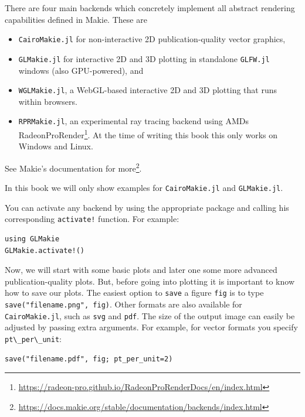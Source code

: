 \documentclass[
  notoc %
]{tufte-book}
\DeclareRobustCommand{\href}[2]{#2\footnote{\url{#1}}}
\providecommand{\tightlist}{%
  \setlength{\itemsep}{0pt}\setlength{\parskip}{0pt}
}
\newcommand{\passthrough}[1]{#1}
\begin{document}
There are four main backends which concretely implement all abstract
rendering capabilities defined in Makie. These are

\begin{itemize}
\tightlist
\item
  \passthrough{\lstinline!CairoMakie.jl!} for non-interactive 2D
  publication-quality vector graphics,
\item
  \passthrough{\lstinline!GLMakie.jl!} for interactive 2D and 3D
  plotting in standalone \passthrough{\lstinline!GLFW.jl!} windows (also
  GPU-powered), and
\item
  \passthrough{\lstinline!WGLMakie.jl!}, a WebGL-based interactive 2D
  and 3D plotting that runs within browsers.
\item
  \passthrough{\lstinline!RPRMakie.jl!}, an experimental ray tracing
  backend using AMDs
  \href{https://radeon-pro.github.io/RadeonProRenderDocs/en/index.html}{RadeonProRender}.
  At the time of writing this book this only works on Windows and Linux.
\end{itemize}

\href{https://docs.makie.org/stable/documentation/backends/index.html}{See
Makie's documentation for more}.

In this book we will only show examples for
\passthrough{\lstinline!CairoMakie.jl!} and
\passthrough{\lstinline!GLMakie.jl!}.

You can activate any backend by using the appropriate package and
calling his corresponding \passthrough{\lstinline"activate!"} function.
For example:

\begin{lstlisting}
using GLMakie
GLMakie.activate!()
\end{lstlisting}

Now, we will start with some basic plots and later one some more
advanced publication-quality plots. But, before going into plotting it
is important to know how to save our plots. The easiest option to
\passthrough{\lstinline!save!} a figure \passthrough{\lstinline!fig!} is
to type \passthrough{\lstinline!save("filename.png", fig)!}. Other
formats are also available for \passthrough{\lstinline!CairoMakie.jl!},
such as \passthrough{\lstinline!svg!} and \passthrough{\lstinline!pdf!}.
The size of the output image can easily be adjusted by passing extra
arguments. For example, for vector formats you specify
\passthrough{\lstinline!pt\_per\_unit!}:

\begin{lstlisting}
save("filename.pdf", fig; pt_per_unit=2)
\end{lstlisting}
\end{document}
